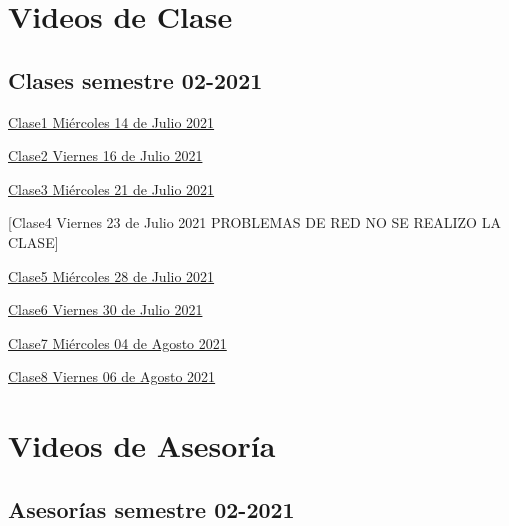 \documentclass[
]{book}
\theoremstyle{definition}
\theoremstyle{definition}
\theoremstyle{definition}
\theoremstyle{definition}
\theoremstyle{remark}
\begin{document}
\hypertarget{videos-de-clase}{%
\chapter{Videos de Clase}\label{videos-de-clase}}

\hypertarget{clases-semestre-02-2021}{%
\section{Clases semestre 02-2021}\label{clases-semestre-02-2021}}

\href{https://ucesedu-my.sharepoint.com/:v:/g/personal/jestrada_ces_edu_co/EcW4-ARUR_pAle6_zBnBtGoBdYWSsPRCVFZQszjdWHFzjA?e=ZK3UQ9}{Clase1 Miércoles 14 de Julio 2021}

\href{https://ucesedu-my.sharepoint.com/:v:/g/personal/jestrada_ces_edu_co/EQoVbUGbrmJEowXESb6CpicB0JEoonbDN9-VdOZnuj976w?e=u3r92I}{Clase2 Viernes 16 de Julio 2021}

\href{https://ucesedu-my.sharepoint.com/:v:/g/personal/jestrada_ces_edu_co/Ee6nFXz-reVFoTFQLAsBjxcBNweX4cgLZnRUVp9fv1aPlg?e=uF5o1O}{Clase3 Miércoles 21 de Julio 2021}

{[}Clase4 Viernes 23 de Julio 2021 PROBLEMAS DE RED NO SE REALIZO LA CLASE{]}

\href{https://ucesedu-my.sharepoint.com/:v:/g/personal/jestrada_ces_edu_co/EUgB9cGyPQlLlgfg8_niKpMB4xU4fVxQTwFIhuVlgF72vg?e=zDxSIF}{Clase5 Miércoles 28 de Julio 2021}

\href{https://ucesedu-my.sharepoint.com/:v:/g/personal/jestrada_ces_edu_co/Eaw1mCf-FY5GiW86uhnjfb0BcZcBcFJTxLqP7fNS_Xxwxw?e=rdgPDa}{Clase6 Viernes 30 de Julio 2021}

\href{https://ucesedu-my.sharepoint.com/:v:/g/personal/jestrada_ces_edu_co/EWVsuXTmL7pOrYhTfQUK1JUBJduPXmi_MQARUBSnBGbwDg?e=Ndsv9N}{Clase7 Miércoles 04 de Agosto 2021}

\href{https://ucesedu-my.sharepoint.com/:v:/g/personal/jestrada_ces_edu_co/ESRTE_mdbwVFtZIrK319T2gBTsBRjddWSzbzDZVkrp-4ag?e=pBhMKE}{Clase8 Viernes 06 de Agosto 2021}

\hypertarget{videos-de-asesoruxeda}{%
\chapter{Videos de Asesoría}\label{videos-de-asesoruxeda}}

\hypertarget{asesoruxedas-semestre-02-2021}{%
\section{Asesorías semestre 02-2021}\label{asesoruxedas-semestre-02-2021}}

  
\end{document}
